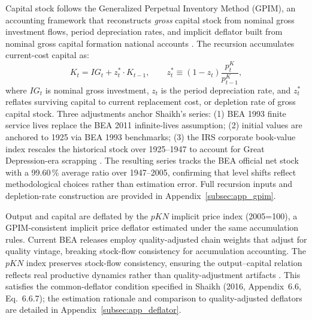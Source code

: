 \documentclass[11pt]{article}
\begin{document}
Capital stock follows the Generalized Perpetual Inventory Method (GPIM), an accounting framework that reconstructs \textit{gross} capital stock from nominal gross investment flows, period depreciation rates, and implicit deflator built from nominal gross capital formation national accounts  \citep{Shaikh2016}. The recursion accumulates current-cost capital as:
\begin{equation}
K_t = IG_t + z_t^* \cdot K_{t-1},
\qquad
z_t^* \equiv (1 - z_t) \frac{p^K_t}{p^K_{t-1}},
\end{equation}
where $IG_t$ is nominal gross investment, $z_t$ is the period depreciation rate, and $z_t^*$ reflates surviving capital to current replacement cost, or depletion rate of gross capital stock. Three adjustments anchor Shaikh's series: (1) BEA 1993 finite service lives replace the BEA 2011 infinite-lives assumption; (2) initial values are anchored to 1925 via BEA 1993 benchmarks; (3) the IRS corporate book-value index rescales the historical stock over 1925--1947 to account for Great Depression-era scrapping \citep[Appendix~6.7, Sec.~V]{Shaikh2016}. The resulting series tracks the BEA official net stock with a 99.60\,\% average ratio over 1947--2005, confirming that level shifts reflect methodological choices rather than estimation error. Full recursion inputs and depletion-rate construction are provided in Appendix~\ref{subsec:app_gpim}.

Output and capital are deflated by the $pKN$ implicit price index (2005=100), a GPIM-consistent implicit price deflator estimated under the same accumulation rules. Current BEA releases employ quality-adjusted chain weights that adjust for quality vintage, breaking stock-flow consistency for accumulation accounting. The $pKN$ index preserves stock-flow consistency, ensuring the output--capital relation reflects real productive dynamics rather than quality-adjustment artifacts \citep[Appendix~6.6, Sec.~II]{Shaikh2016}. This satisfies the common-deflator condition specified in Shaikh (2016, Appendix~6.6, Eq.~6.6.7); the estimation rationale and comparison to quality-adjusted deflators are detailed in Appendix~\ref{subsec:app_deflator}.
\end{document}

